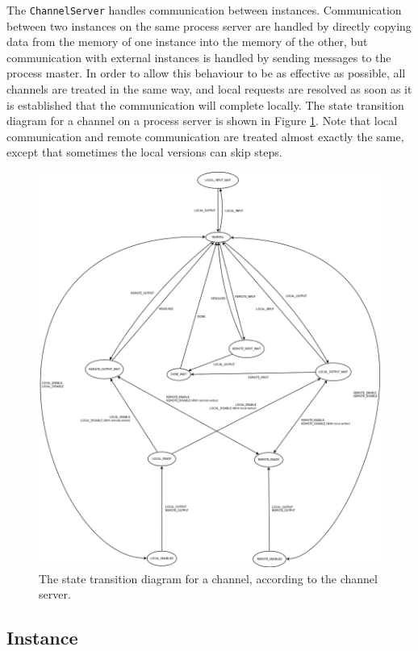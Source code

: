 The \texttt{ChannelServer} handles communication between instances.
Communication between two instances on the same process server are handled
by directly copying data from the memory of one instance into the memory of the
other, but communication with external instances is handled by sending messages
to the process master. In order to allow this behaviour to be as effective as
possible, all channels are treated in the same way, and local requests are
resolved as soon as it is established that the communication will complete
locally. The state transition diagram for a channel on a process server is shown
in Figure \ref{channel-server}. Note that local communication and remote
communication are treated almost exactly the same, except that sometimes the
local versions can skip steps.

\begin{figure}[H]
  \centering
  \includegraphics[width=\textwidth]{diagrams/channel_server}
  \caption{
    The state transition diagram for a channel, according to the channel
    server.
  }
  \label{channel-server}
\end{figure}

\subsection{Instance}

